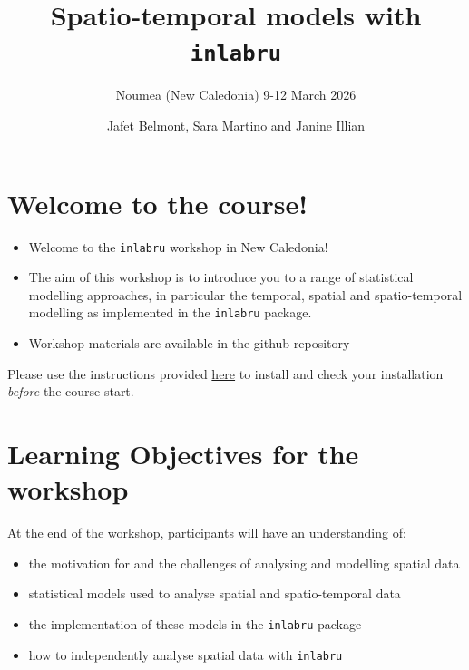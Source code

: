 \documentclass[
  letterpaper,
  DIV=11,
  numbers=noendperiod]{scrartcl}
\title{Spatio-temporal models with \texttt{inlabru}}
\subtitle{Noumea (New Caledonia) 9-12 March 2026}
\author{Jafet Belmont, Sara Martino and Janine Illian}
\date{}
\makeatletter
\providecommand{\tightlist}{%
  \setlength{\itemsep}{0pt}\setlength{\parskip}{0pt}}
\renewcommand{\maketitle}{\bgroup\setlength{\parindent}{0pt}
\begin{flushleft}
  {\sffamily\huge\textbf{\MakeUppercase{\@title}}} \vspace{0.3cm} \newline
  {\Large {\@subtitle}} \newline
  \@author
\end{flushleft}\egroup
}
\makeatother
\begin{document}
\maketitle

\pagestyle{mystyle}


\section{Welcome to the course!}\label{welcome-to-the-course}

\begin{itemize}
\tightlist
\item
  Welcome to the \texttt{inlabru} workshop in New Caledonia!
\item
  The aim of this workshop is to introduce you to a range of statistical
  modelling approaches, in particular the temporal, spatial and
  spatio-temporal modelling as implemented in the \texttt{inlabru}
  package.
\item
  Workshop materials are available in the github repository
\end{itemize}

\begin{tcolorbox}[enhanced jigsaw, left=2mm, bottomtitle=1mm, leftrule=.75mm, colbacktitle=quarto-callout-warning-color!10!white, coltitle=black, opacityback=0, colframe=quarto-callout-warning-color-frame, title=\textcolor{quarto-callout-warning-color}{\faExclamationTriangle}\hspace{0.5em}{Important! ⚠️}, toptitle=1mm, bottomrule=.15mm, rightrule=.15mm, toprule=.15mm, opacitybacktitle=0.6, titlerule=0mm, colback=white, breakable, arc=.35mm]

Please use the instructions provided \href{Install_software.qmd}{here}
to install and check your installation \emph{before} the course start.

\end{tcolorbox}

\section{Learning Objectives for the
workshop}\label{learning-objectives-for-the-workshop}

At the end of the workshop, participants will have an understanding of:

\begin{itemize}
\tightlist
\item
  the motivation for and the challenges of analysing and modelling
  spatial data
\item
  statistical models used to analyse spatial and spatio-temporal data
\item
  the implementation of these models in the \texttt{inlabru} package
\item
  how to independently analyse spatial data with \texttt{inlabru}
\end{itemize}
\end{document}
